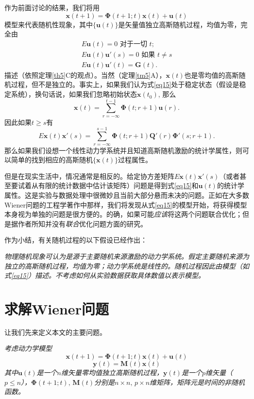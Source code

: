 \documentclass[UTF8,adobefonts]{ctexart}
\newcommand{\boldPhi}{\boldsymbol{\Phi}}
\begin{document}
作为前面讨论的结果，我们将用
\begin{equation}
\label{eq15}
\mathbf{x}(t+1)=\boldPhi(t+1;t)\mathbf{x}(t)+\mathbf{u}(t)
\end{equation}
模型来代表随机性现象，其中$\{\mathbf{u}(t)\}$是矢量值独立高斯随机过程，均值为零，完全由
\begin{align*}
E\mathbf{u}(t)=0 \text{ 对于一切 } t;\\
E\mathbf{u}(t)\mathbf{u'}(s)=0 \text{ 如果 } t \ne s\\
E\mathbf{u}(t)\mathbf{u'}(t)=\mathbf{G}(t).
\end{align*}
描述（依照定理\ref{th5}C的观点）。当然（定理\ref{tm5}A），$\mathbf{x}(t)$也是零均值的高斯随机过程，但不是独立的。事实上，如果我们认为式\ref{eq15}处于稳定状态（假设是稳定系统），换句话说，如果我们忽略初始状态$\mathbf{x}(t_0)$, 那么
\begin{equation*}
\mathbf{x}(t)=\sum^{t-1}_{r=-\infty}\boldPhi(t;r+1)\mathbf{u}(r).
\end{equation*}
因此如果$t \ge s$有
\begin{equation*}
E\mathbf{x}(t)\mathbf{x'}(s)=\sum^{s-1}_{r=-\infty}\boldPhi(t;r+1)\mathbf{Q'}(r)\boldsymbol{\Phi'}(s;r+1).
\end{equation*}
那么如果我们设想一个线性动力学系统并且知道高斯随机激励的统计学属性，则可以简单的找到相应的高斯随机$\{\mathbf{x}(t)\}$过程属性。

但是在现实生活中，情况通常是相反的。给定协方差矩阵$E\mathbf{x}(t)\mathbf{x'}(s)$（或者甚至要试着从有限的统计数据中估计该矩阵）问题是得到式\ref{eq15}和$\mathbf{u}(t)$的统计学属性。这是实验与数据处理中很微妙且当前大部分悬而未决的问题。正如在大多数Wiener问题的工程学著作中那样，我们将发现从式\ref{eq15}的模型开始，将获得模型本身视为单独的问题是很方便的。的确，如果可能\emph{应该}将这两个问题联合优化；但是据作者所知并没有\emph{联合}优化问题方面的研究。

作为小结，有关随机过程的以下假设已经作出：

\emph{物理随机现象可认为是源于主要随机来源激励的动力学系统。假定主要随机来源为独立的高斯随机过程，均值为零；动力学系统是线性的。随机过程因此由模型（如式\ref{eq15}）描述。不考虑如何从实验数据获取具体数值以表示模型。}

\section{求解Wiener问题}
让我们先来定义本文的主要问题。

{}\emph{考虑动力学模型}
\begin{equation}
\label{eq16}
\mathbf{x}(t+1)=\boldsymbol{\Phi}(t+1;t)\mathbf{x}(t)+\mathbf{u}(t)
\end{equation}
\begin{equation}
\label{eq17}
\mathbf{y}(t)=\mathbf{M}(t)\mathbf{x}(t)
\end{equation}
\emph{其中}$\mathbf{u}(t)$\emph{是一个}$n$\emph{维矢量零均值独立高斯随机过程，}$\mathbf{y}(t)$\emph{是一个}$p$\emph{维矢量（}$p \le n$\emph{），}$\boldsymbol{\Phi}(t+1;t)\text{, }\mathbf{M}(t)$\emph{分别是}$n \times n\text{, }p \times n$\emph{维矩阵，矩阵元是时间的非随机函数。}
\end{document}
